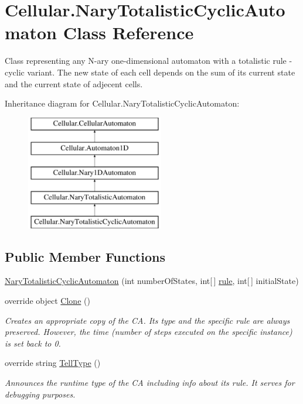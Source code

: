 \hypertarget{class_cellular_1_1_nary_totalistic_cyclic_automaton}{}\section{Cellular.\+Nary\+Totalistic\+Cyclic\+Automaton Class Reference}
\label{class_cellular_1_1_nary_totalistic_cyclic_automaton}


Class representing any N-\/ary one-\/dimensional automaton with a totalistic rule -\/ cyclic variant. The new state of each cell depends on the sum of its current state and the current state of adjecent cells.  


Inheritance diagram for Cellular.\+Nary\+Totalistic\+Cyclic\+Automaton\+:\begin{figure}[H]
\begin{center}
\leavevmode
\includegraphics[height=5.000000cm]{class_cellular_1_1_nary_totalistic_cyclic_automaton}
\end{center}
\end{figure}
\subsection*{Public Member Functions}
\begin{DoxyCompactItemize}
\item 
\hyperlink{class_cellular_1_1_nary_totalistic_cyclic_automaton_a4616b10ffadcaef7a2d21b47976844af}{Nary\+Totalistic\+Cyclic\+Automaton} (int number\+Of\+States, int\mbox{[}$\,$\mbox{]} \hyperlink{class_cellular_1_1_nary_totalistic_automaton_a878c767c6823bd8ed8dc0f7d2ccb1fd2}{rule}, int\mbox{[}$\,$\mbox{]} initial\+State)
\item 
override object \hyperlink{class_cellular_1_1_nary_totalistic_cyclic_automaton_aa8d5a7d77a6dfc5f6e4fae6ba1c6cfd0}{Clone} ()
\begin{DoxyCompactList}\small\item\em Creates an appropriate copy of the C\+A. Its type and the specific rule are always preserved. However, the time (number of steps executed on the specific instance) is set back to 0. \end{DoxyCompactList}\item 
override string \hyperlink{class_cellular_1_1_nary_totalistic_cyclic_automaton_ac5c39cfb72386e3ab6132ab420091ae9}{Tell\+Type} ()
\begin{DoxyCompactList}\small\item\em Announces the runtime type of the C\+A including info about its rule. It serves for debugging purposes. \end{DoxyCompactList}\end{DoxyCompactItemize}
